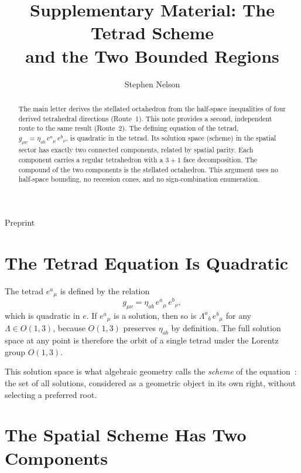 \documentclass[twocolumn]{iopjournal}
\renewcommand{\articletype}[1]{%
  {\vspace*{-8mm}\noindent \Large \sf Preprint}\par
  \vspace*{6mm}\noindent{\scriptsize \sf{\bfseries \MakeUppercase{#1}}}}
\begin{document}
\articletype{Supplementary Material}

\title{Supplementary Material: The Tetrad Scheme\\and the Two Bounded Regions}

\author{Stephen Nelson}


\begin{abstract}
The main letter derives the stellated octahedron from the half-space inequalities of four derived tetrahedral directions (Route~1). This note provides a second, independent route to the same result (Route~2). The defining equation of the tetrad, $g_{\mu\nu} = \eta_{ab}\, e^a{}_\mu\, e^b{}_\nu$, is quadratic in the tetrad. Its solution space (scheme) in the spatial sector has exactly two connected components, related by spatial parity. Each component carries a regular tetrahedron with a $3+1$ face decomposition. The compound of the two components is the stellated octahedron. This argument uses no half-space bounding, no recession cones, and no sign-combination enumeration.
\end{abstract}


\section*{The Tetrad Equation Is Quadratic}

The tetrad $e^a{}_\mu$ is defined by the relation
\begin{equation}
g_{\mu\nu} = \eta_{ab}\, e^a{}_\mu\, e^b{}_\nu,
\end{equation}
which is quadratic in $e$. If $e^a{}_\mu$ is a solution, then so is $\Lambda^a{}_b\, e^b{}_\mu$ for any $\Lambda \in O(1,3)$, because $O(1,3)$ preserves $\eta_{ab}$ by definition. The full solution space at any point is therefore the orbit of a single tetrad under the Lorentz group $O(1,3)$.

This solution space is what algebraic geometry calls the \emph{scheme} of the equation~\cite{Grothendieck1960,Hartshorne1977}: the set of all solutions, considered as a geometric object in its own right, without selecting a preferred root.


\section*{The Spatial Scheme Has Two Components}
\end{document}
